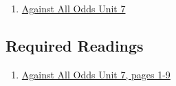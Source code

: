 \documentclass[letterpaper,9pt,twocolumn,twoside,printwatermark=false]{pinp}
\providecommand{\tightlist}{%
  \setlength{\itemsep}{0pt}\setlength{\parskip}{0pt}}
\begin{document}
\begin{enumerate}
\def\labelenumi{\arabic{enumi}.}
\tightlist
\item
  \href{https://www.learner.org/courses/againstallodds/unitpages/unit07.html}{Against
  All Odds Unit 7}
\end{enumerate}

\hypertarget{required-readings-2}{%
\subsection{Required Readings}\label{required-readings-2}}

\begin{enumerate}
\item \href{https://www.learner.org/courses/againstallodds/pdfs/AgainstAllOdds_StudentGuide_Unit07.pdf#page=1}{Against All Odds Unit 7, pages 1-9}
\end{enumerate}





\end{document}
